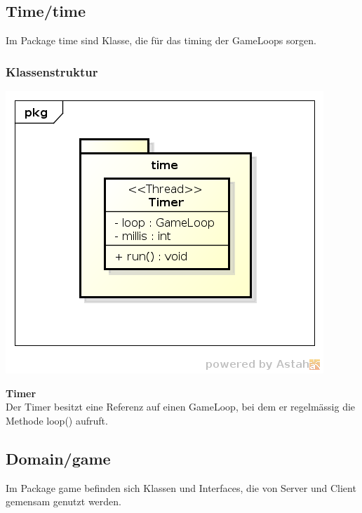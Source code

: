 \documentclass[11pt]{scrartcl}
\begin{document}
\newpage

\subsection{Time/time}
Im Package time sind Klasse, die für das timing der GameLoops sorgen.
\subsubsection{Klassenstruktur}
\includegraphics[scale=0.8]{ClassDiagramTime}

\textbf{Timer}\\
Der Timer besitzt eine Referenz auf einen GameLoop, bei dem er regelmässig die Methode loop() aufruft.

\newpage

\subsection{Domain/game}
Im Package game befinden sich Klassen und Interfaces, die von Server und Client gemensam genutzt werden.
\end{document}

